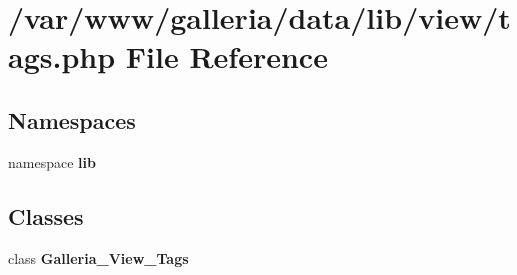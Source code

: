\section{/var/www/galleria/data/lib/view/tags.php File Reference}
\label{tags_8php}
\subsection*{Namespaces}
\begin{CompactItemize}
\item 
namespace {\bf lib}
\end{CompactItemize}
\subsection*{Classes}
\begin{CompactItemize}
\item 
class {\bf Galleria\_\-View\_\-Tags}
\end{CompactItemize}
